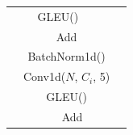 \documentclass[10pt,twocolumn,letterpaper]{article}
\begin{document}
\begin{CJK}{UTF8}{bkai}
\begin{table}[h]
\begin{center}
\begin{tabular}{ | c c c c }
            \cline{2-2}
                                                                                        & \multicolumn{1}{|c|}{GLEU()}                                     & \multicolumn{1}{c|}{}                                                   & \multicolumn{1}{c|}{} \\
            \cline{2-3}
                                                                                        & \multicolumn{2}{|c|}{Add}                                        & \multicolumn{1}{c|}{}                                                                           \\
            \cline{2-3}
                                                                                        & \multicolumn{2}{|c|}{BatchNorm1d()}                              & \multicolumn{1}{c|}{}                                                                           \\
            \cline{2-3}
                                                                                        & \multicolumn{2}{|c|}{Conv1d($N$, $C_i$, 5)}                      & \multicolumn{1}{c|}{}                                                                           \\
            \cline{2-3}
                                                                                        & \multicolumn{2}{|c|}{GLEU()}                                     & \multicolumn{1}{c|}{}                                                                           \\
            \cline{2-4}
                                                                                        & \multicolumn{3}{|c|}{Add}                                                                                                                                          \\
            \hline
         \end{tabular}
      \end{center}
   \end{table}

\end{CJK}
\end{document}
